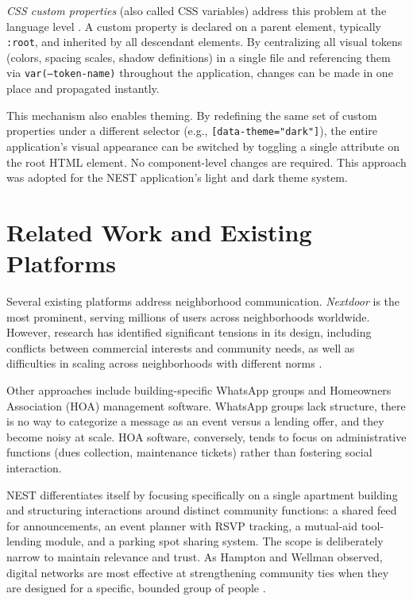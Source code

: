 \textit{CSS custom properties} (also called CSS variables) address this problem at the language level \cite{mdnCssCustomProperties}. A custom property is declared on a parent element, typically \texttt{:root}, and inherited by all descendant elements. By centralizing all visual tokens (colors, spacing scales, shadow definitions) in a single file and referencing them via \texttt{var(--token-name)} throughout the application, changes can be made in one place and propagated instantly.

This mechanism also enables theming. By redefining the same set of custom properties under a different selector (e.g., \texttt{[data-theme="dark"]}), the entire application's visual appearance can be switched by toggling a single attribute on the root HTML element. No component-level changes are required. This approach was adopted for the NEST application's light and dark theme system.

\section{Related Work and Existing Platforms}

Several existing platforms address neighborhood communication. \textit{Nextdoor} is the most prominent, serving millions of users across neighborhoods worldwide. However, research has identified significant tensions in its design, including conflicts between commercial interests and community needs, as well as difficulties in scaling across neighborhoods with different norms \cite{masden2014tensions}.

Other approaches include building-specific WhatsApp groups and Homeowners Association (HOA) management software. WhatsApp groups lack structure, there is no way to categorize a message as an event versus a lending offer, and they become noisy at scale. HOA software, conversely, tends to focus on administrative functions (dues collection, maintenance tickets) rather than fostering social interaction.

NEST differentiates itself by focusing specifically on a single apartment building and structuring interactions around distinct community functions: a shared feed for announcements, an event planner with RSVP tracking, a mutual-aid tool-lending module, and a parking spot sharing system. The scope is deliberately narrow to maintain relevance and trust. As Hampton and Wellman observed, digital networks are most effective at strengthening community ties when they are designed for a specific, bounded group of people \cite{hampton2003neighboring}.